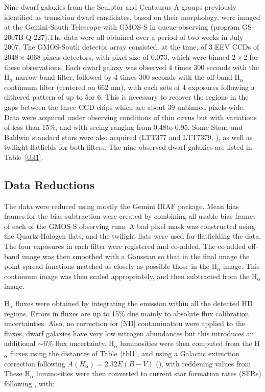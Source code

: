 \documentclass[12pt,preprint]{emulateapj}
\begin{document}
Nine dwarf galaxies from the Sculptor and Centaurus A groups previously identified as transition dwarf candidates, based on their morphology,  were 
imaged at the Gemini-South Telescope with GMOS-S in queue-observing (program GS-2007B-Q-227).The data were all obtained over a period of two 
weeks in July 2007. The GMOS-South detector array consisted, at the time, of 3 EEV CCDs of $2048\times 4068$ pixels detectors, with pixel size of 
0.073\arcsec, which were binned $2\times 2$ for these observations. Each dwarf galaxy was observed 4 times 300 seconds with the H$_\alpha$ 
narrow-band filter, followed by 4 times 300 seconds with the off-band H$_\alpha$ continuum filter (centered on 662 nm), with each sets of 4 exposures 
following a dithered pattern of up to 5\arcsec or 6\arcsec. This is necessary to recover the regions in the gaps between the three CCD chips which are 
about 39 unbinned pixels wide. Data were acquired under observing conditions of thin cirrus but with variations of less than 15\%, and with seeing
ranging from 0.48\arcsec to 0.95\arcsec. Some Stone and Baldwin standard stars were also acquired (LTT377 and LTT7379, \cite{sb83}), as well as 
twilight flatfields for both filters. The nine observed dwarf galaxies are listed in Table~\ref{tbl1}.

\subsection{Data Reductions}

The data were reduced using mostly the Gemini IRAF package. Mean bias frames for the bias subtraction were created by combining all usable bias 
frames of each of the GMOS-S observing runs. A bad pixel mask was constructed using the Quartz-Halogen flats, and the twilight flats were used for 
flatfielding the data. The four exposures in each filter were registered and co-added. The co-added off-band image was then smoothed with a Gaussian 
so that in the final image the point-spread functions matched as closely as possible those in the H$_\alpha$ image. This continuum image was then scaled 
appropriately, and then subtracted from the H$_\alpha$ image. 

H$_\alpha$ fluxes were obtained by integrating the emission within all the detected HII regions. Errors in fluxes are up to 15\% due mainly to absolute 
flux calibration uncertainties. Also, no correction for [NII] contamination were applied to the fluxes, dwarf galaxies have very low nitrogen abundances
\cite[see, e.g.,][]{scm03b} but this introduces an additional $\sim $6\% flux uncertainty. H$_\alpha$ luminosities were then computed from the H$_\alpha$ 
fluxes using the distances of Table~\ref{tbl1}, and using a Galactic extinction correction following $A(H_\alpha ) = 2.32 E(B-V)$ (\cite{mh94}), with reddening values 
from \cite{sfd98}. These H$_\alpha$ luminosities were then converted to current star formation rates (SFRs) following \cite{ktc94}, with:
\end{document}

